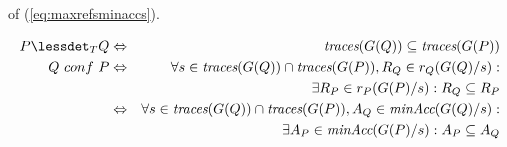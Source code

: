 of (\ref{eq:maxrefsminaccs}).
%
\begin{lemma}
  \label{lemma:tgtrcref}
  \begin{eqnarray}
  P \lessdet_T Q & \Leftrightarrow & \trc(G(Q)) \subseteq\trc(G(P))
  \label{eq:trcrefa}
  \\
  \label{eq:failrefa}
  Q\ conf\ P & \Leftrightarrow & \nonumber
  \forall s\in\trc(G(Q))\cap \trc(G(P)), R_Q\in r_Q(G(Q)/s):  \nonumber
  \\ & & \tabd
  \exists R_P\in r_P(G(P)/s): R_Q\subseteq R_P
  \\
  \label{eq:failrefb}
   & \Leftrightarrow &
    \forall s\in\trc(G(Q))\cap \trc(G(P)), A_Q\in\minaccs(G(Q)/s):  \nonumber
   \\ & & \tabd
  \exists A_P\in\minaccs(G(P)/s): A_P\subseteq A_Q
 \end{eqnarray}
  \xbox
\end{lemma}
%
